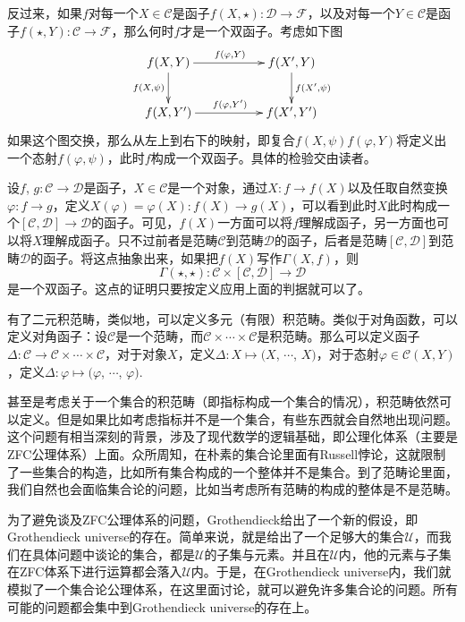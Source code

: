 反过来，如果$f$对每一个$X\in \mathcal{C}$是函子$f(X,\star):\mathcal{D}\to \mathcal{F}$，以及对每一个$Y\in \mathcal{C}$是函子$f(\star,Y):\mathcal{C}\to \mathcal{F}$，那么何时$f$才是一个双函子。考虑如下图
\[
\begin{xy}
	\xymatrix{
		f(X,Y)\ar[rr]^{f(\varphi,Y)} \ar[d]_{f(X,\psi)}&&f(X',Y) \ar[d]^{f(X',\psi)}\\
		f(X,Y')\ar[rr]^{f(\varphi,Y')}&&f(X',Y')
	}
\end{xy}
\]
如果这个图交换，那么从左上到右下的映射，即复合$f(X,\psi)f(\varphi,Y)$将定义出一个态射$f(\varphi,\psi)$，此时$f$构成一个双函子。具体的检验交由读者。

\para 设$f$, $g:\mathcal{C}\to \mathcal{D}$是函子，$X\in \mathcal{C}$是一个对象，通过$X:f\to f(X)$以及任取自然变换$\varphi:f\to g$，定义$X(\varphi)=\varphi(X):f(X)\to g(X)$，可以看到此时$X$此时构成一个$[\mathcal{C},\mathcal{D}] \to \mathcal{D}$的函子。可见，$f(X)$一方面可以将$f$理解成函子，另一方面也可以将$X$理解成函子。只不过前者是范畴$\mathcal{C}$到范畴$\mathcal{D}$的函子，后者是范畴$[\mathcal{C},\mathcal{D}]$到范畴$\mathcal{D}$的函子。将这点抽象出来，如果把$f(X)$写作$\Gamma(X,f)$，则
\[
	\Gamma(\star,\star):\mathcal{C}\times [\mathcal{C},\mathcal{D}]\to \mathcal{D}
\]
是一个双函子。这点的证明只要按定义应用上面的判据就可以了。

\para 有了二元积范畴，类似地，可以定义多元（有限）积范畴。类似于对角函数，可以定义对角函子：设$\mathcal{C}$是一个范畴，而$\mathcal{C}\times \cdots \times \mathcal{C}$是积范畴。那么可以定义函子$\Delta:\mathcal{C}\to \mathcal{C}\times \cdots \times \mathcal{C}$，对于对象$X$，定义$\Delta:X\mapsto (X$, $\cdots$, $X)$，对于态射$\varphi\in \mathcal{C}(X,Y)$，定义$\Delta: \varphi \mapsto (\varphi$, $\cdots$, $\varphi)$.

甚至是考虑关于一个集合的积范畴（即指标构成一个集合的情况），积范畴依然可以定义。但是如果比如考虑指标并不是一个集合，有些东西就会自然地出现问题。这个问题有相当深刻的背景，涉及了现代数学的逻辑基础，即公理化体系（主要是ZFC公理体系）上面。众所周知，在朴素的集合论里面有Russell悖论，这就限制了一些集合的构造，比如所有集合构成的一个整体并不是集合。到了范畴论里面，我们自然也会面临集合论的问题，比如当考虑所有范畴的构成的整体是不是范畴。

为了避免谈及ZFC公理体系的问题，Grothendieck给出了一个新的假设，即Grothendieck universe的存在。简单来说，就是给出了一个足够大的集合$\mathscr{U}$，而我们在具体问题中谈论的集合，都是$\mathscr{U}$的子集与元素。并且在$\mathscr{U}$内，他的元素与子集在ZFC体系下进行运算都会落入$\mathscr{U}$内。于是，在Grothendieck universe内，我们就模拟了一个集合论公理体系，在这里面讨论，就可以避免许多集合论的问题。所有可能的问题都会集中到Grothendieck universe的存在上。


